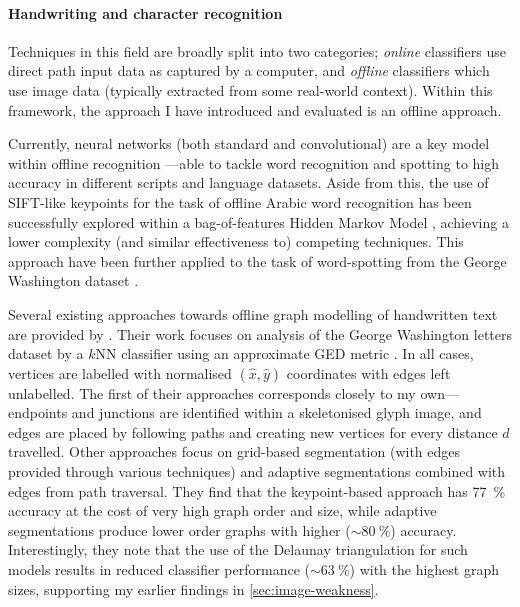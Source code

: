 \documentclass{mpaper}
\begin{document}

\paragraph{Handwriting and character recognition}
Techniques in this field are broadly split into two categories; \emph{online} classifiers use direct path input data as captured by a computer, and \emph{offline} classifiers which use image data (typically extracted from some real-world context).
Within this framework, the approach I have introduced and evaluated is an offline approach.

Currently, neural networks (both standard and convolutional) are a key model within offline recognition \cite{Handwriting-CNN-1,Handwriting-CNN-2}---able to tackle word recognition and spotting to high accuracy in different scripts and language datasets.
Aside from this, the use of SIFT-like keypoints for the task of offline Arabic word recognition has been successfully explored within a bag-of-features Hidden Markov Model \cite{Arabic-SIFT}, achieving a lower complexity (and similar effectiveness to) competing techniques.
This approach have been further applied to the task of word-spotting from the George Washington dataset \cite{Arabic-SIFT-Better}.

Several existing approaches towards offline graph modelling of handwritten text are provided by \citeauthor{Graphs-Handwriting} \cite{Graphs-Handwriting}.
Their work focuses on analysis of the George Washington letters dataset by a $k$NN classifier using an approximate GED metric \cite{GED-Approx}.
In all cases, vertices are labelled with normalised $(\hat{x}, \hat{y})$ coordinates with edges left unlabelled.
The first of their approaches corresponds closely to my own---endpoints and junctions are identified within a skeletonised glyph image, and edges are placed by following paths and creating new vertices for every distance $d$ travelled.
Other approaches focus on grid-based segmentation (with edges provided through various techniques) and adaptive segmentations combined with edges from path traversal.
They find that the keypoint-based approach has \SI{77}{\percent} accuracy at the cost of very high graph order and size, while adaptive segmentations produce lower order graphs with higher ($\sim\SI{80}{\percent}$) accuracy.
Interestingly, they note that the use of the Delaunay triangulation for such models results in reduced classifier performance ($\sim\SI{63}{\percent}$) with the highest graph sizes, supporting my earlier findings in \cref{sec:image-weakness}.
\end{document}
